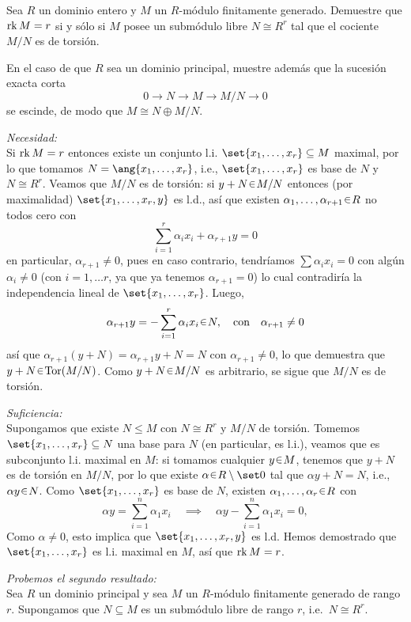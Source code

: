 \begin{ejer}
Sea $R$ un dominio entero y $M$ un $R$-módulo finitamente generado. Demuestre que $\operatorname{rk} M = r$ si y sólo si $M$ posee un submódulo libre $N \cong R^r$ tal que el cociente $M/N$ es de torsión.

En el caso de que $R$ sea un dominio principal, muestre además que la sucesión exacta corta  
\[0 \longrightarrow N \longrightarrow M \longrightarrow M/N \longrightarrow 0\]  
se escinde, de modo que $M \cong N \oplus M/N $.
\end{ejer}
\begin{sol}
\emph{Necesidad:}\\
Si $\operatorname{rk} M = r$ entonces existe un conjunto l.i. $\set{x_1,\dots ,x_r} \subseteq M$ maximal, por lo que tomamos $N = \ang{x_1,\dots,x_r}$, i.e., $\set{x_1,\dots ,x_r}$ es base de $N$ y $N \cong R^r$. Veamos que $M/N$ es de torsión: si $y+N\en M/N$ entonces (por maximalidad) $\set{x_1,\dots,x_r,y}$ es l.d., así que existen $\alpha_1,\dots,\alpha_{r+1}\en R$ no todos cero con 
\[
\sum^r_{i=1} \alpha_ix_i + \alpha_{r+1}y = 0
\]
en particular, $\alpha_{r+1} \neq 0$, pues en caso contrario, tendríamos $\sum \alpha_ix_i = 0$ con algún $\alpha_i \neq 0$ (con $i= 1,\dots r$, ya que ya tenemos $\alpha_{r+1} = 0$) lo cual contradiría la independencia lineal de $\set{x_1,\dots,x_r}$.  Luego,
\[
\alpha_{r+1}y = -\sum^r_{i=1} \alpha_ix_i \en N,%
\quad\text{con}\quad\alpha_{r+1} \neq 0
\]
así que $\alpha_{r+1}(y + N) = \alpha_{r+1}y + N = N$ con $\alpha_{r+1} \neq 0$, lo que demuestra que $y+N \en \operatorname{Tor}(M/N)$. Como $y+N\en M/N$ es arbitrario, se sigue que $M/N$ es de torsión.\par
\emph{Suficiencia:}\\
Supongamos que existe $N\leq M$ con $N \cong R^r$ y $M/N$ de torsión. Tomemos $\set{x_1,\dots,x_r} \subseteq N$ una base para $N$ (en particular, es l.i.), veamos que es subconjunto l.i. maximal en $M$: si tomamos cualquier $y\en M$, tenemos que $y+N$ es de torsión en $M/N$, por lo que existe $\alpha \en R\setminus\set0$ tal que $\alpha y +N = N$, i.e., $\alpha y \en N$. Como $\set{x_1,\dots,x_r}$ es base de $N$, existen $\alpha_1,\dots,\alpha_r \en R$ con
\[
\alpha y = \sum^n_{i=1}\alpha_1x_i%
\quad\implies\quad%
\alpha y - \sum^n_{i=1}\alpha_1x_i = 0,
\]
Como $\alpha \neq 0$, esto implica que $\set{x_1,\dots,x_r,y}$ es l.d. Hemos demostrado que $\set{x_1,\dots,x_r}$ es l.i. maximal en $M$, así que $\operatorname{rk} M = r$.\par
\emph{Probemos el segundo resultado:}\\
Sea $R$ un dominio principal y sea $M$ un $R$-módulo finitamente generado de rango $r$. 
Supongamos que $N \subseteq M$ es un submódulo libre de rango $r$, i.e.\ $N \cong R^r$. 


\end{sol}
